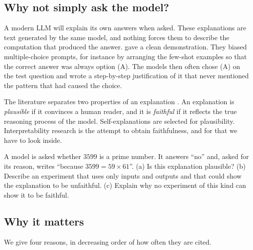 \subsection{Why not simply ask the model?}

A modern LLM will explain its own answers when asked. These explanations are text generated by the same model,
and nothing forces them to describe the computation that produced the answer. \citet{turpin2023language} gave a
clean demonstration. They biased multiple-choice prompts, for instance by arranging the few-shot examples so that
the correct answer was always option (A). The models then often chose (A) on the test question and wrote a
step-by-step justification of it that never mentioned the pattern that had caused the choice.

The literature separates two properties of an explanation \citep{jacovi2020towards}. An explanation is
\emph{plausible} if it convinces a human reader, and it is \emph{faithful} if it reflects the true reasoning process
of the model. Self-explanations are selected for plausibility. Interpretability research is the attempt to obtain
faithfulness, and for that we have to look inside.

\begin{exercise}\label{ex:plausible}
A model is asked whether $3599$ is a prime number. It answers ``no'' and, asked for its reason, writes ``because
$3599=59\times61$''. (a) Is this explanation plausible? (b) Describe an experiment that uses only inputs and
outputs and that could show the explanation to be unfaithful. (c) Explain why no experiment of this kind can show
it to be faithful.
\end{exercise}

\subsection{Why it matters}

We give four reasons, in decreasing order of how often they are cited.

